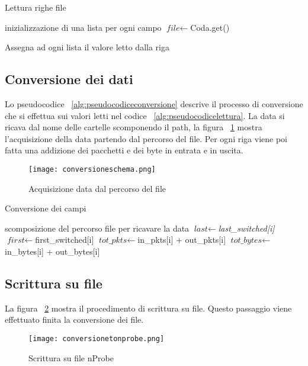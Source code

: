 \documentclass[../main.tex]{subfiles}
\begin{document}
\begin{algorithm}[H]
\caption{Lettura righe file}
				\label{alg:pseudocodicelettura}
\begin{algorithmic}[1]
				\State inizializzazione di una lista per ogni campo
				\State $\textit{file} \gets $Coda.get() 

						\State Assegna ad ogni lista il valore letto dalla riga
				\EndFor
\end{algorithmic}
\end{algorithm}

\subsection{Conversione dei dati}
Lo pseudocodice ~\ref{alg:pseudocodiceconversione} descrive il processo di conversione che si effettua sui valori letti nel codice ~\ref{alg:pseudocodicelettura}. La data si ricava dal nome delle cartelle scomponendo il path, la figura ~\ref{fig:conversioneschema} mostra l'acquisizione della data partendo dal percorso del file. Per ogni riga viene poi fatta una addizione dei pacchetti e dei byte in entrata e in uscita.
\begin{figure}[H]
				\centering
\texttt{[image: conversioneschema.png]}
				\caption{Acquisizione data dal percorso del file}
				\label{fig:conversioneschema}
\end{figure}

\begin{algorithm}[H]
				\caption{Conversione dei campi}
				\label{alg:pseudocodiceconversione}
\begin{algorithmic}[1]
				\State scomposizione del percorso file per ricavare la data
				\State $\textit{last} \gets $\textit{last\_switched[i]} 
				\State $\textit{first} \gets $first\_switched[i]
				\State $\textit{tot\_pkts} \gets $in\_pkts[i] + out\_pkts[i]
				\State $\textit{tot\_bytes} \gets $in\_bytes[i] + out\_bytes[i]
				\EndWhile
\end{algorithmic}
\end{algorithm}

\subsection{Scrittura su file}
La figura ~\ref{fig:conversionetonprobe} mostra il procedimento di scrittura su file. Questo passaggio viene effettuato finita la conversione dei file.
\begin{figure}[H]
				\centering
\texttt{[image: conversionetonprobe.png]}
				\caption{Scrittura su file nProbe}
				\label{fig:conversionetonprobe}
\end{figure}
\end{document}
